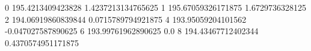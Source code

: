 0 195.4213409423828 1.4237213134765625
1 195.67059326171875 1.6729736328125
2 194.06919860839844 0.0715789794921875
4 193.95059204101562 -0.047027587890625
6 193.99761962890625 0.0
8 194.43467712402344 0.4370574951171875
